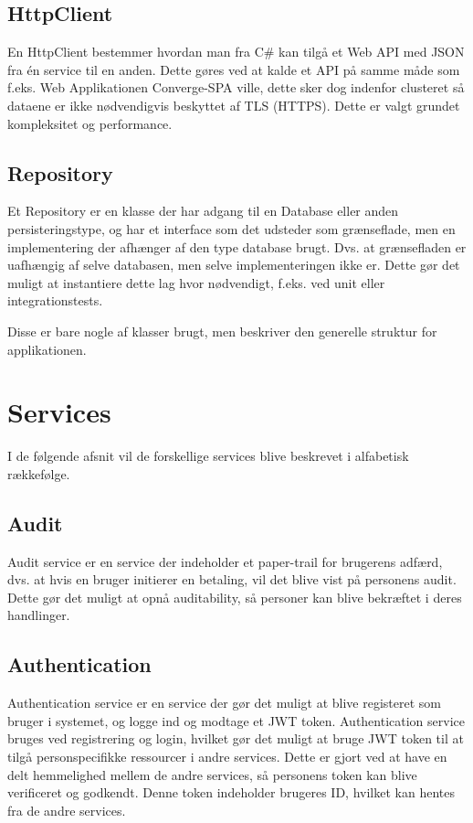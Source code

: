 \subsection{HttpClient}

En HttpClient bestemmer hvordan man fra C\# kan tilgå et Web API med JSON fra én service til en anden. Dette gøres ved at kalde et API på samme måde som f.eks. Web Applikationen Converge-SPA ville, dette sker dog indenfor clusteret så dataene er ikke nødvendigvis beskyttet af TLS (HTTPS). Dette er valgt grundet kompleksitet og performance.

\subsection{Repository}

Et Repository er en klasse der har adgang til en Database eller anden persisteringstype, og har et interface som det udsteder som grænseflade, men en implementering der afhænger af den type database brugt. Dvs. at grænsefladen er uafhængig af selve databasen, men selve implementeringen ikke er. Dette gør det muligt at instantiere dette lag hvor nødvendigt, f.eks. ved unit eller integrationstests.


Disse er bare nogle af klasser brugt, men beskriver den generelle struktur for applikationen.


\section{Services}

I de følgende afsnit vil de forskellige services blive beskrevet i alfabetisk rækkefølge.

\subsection{Audit}
\label{sec:audit-service}

Audit service er en service der indeholder et paper-trail for brugerens adfærd, dvs. at hvis en bruger initierer en betaling, vil det blive vist på personens audit. Dette gør det muligt at opnå auditability, så personer kan blive bekræftet i deres handlinger.

\subsection{Authentication}
\label{sec:authentication-service}

Authentication service er en service der gør det muligt at blive registeret som bruger i systemet, og logge ind og modtage et JWT token. Authentication service bruges ved registrering og login, hvilket gør det muligt at bruge JWT token til at tilgå personspecifikke ressourcer i andre services. Dette er gjort ved at have en delt hemmelighed mellem de andre services, så personens token kan blive verificeret og godkendt. Denne token indeholder brugeres ID, hvilket kan hentes fra de andre services.

